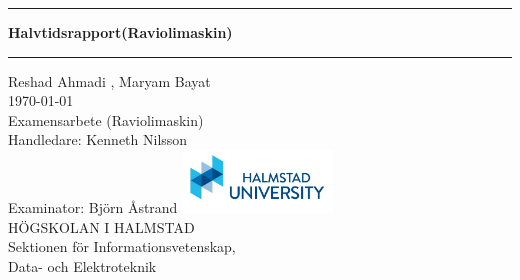 \documentclass[11pt,a4paper,oneside]{book}
\begin{document}
\pagestyle{empty}

\frontmatter

\begin{titlepage}
  \begin{center}
  \end{center}
  \vspace{3cm}
  \begin{center}
    \hrule \vspace{0.5cm}
    {\Huge \bfseries \sffamily \color{hhblue} Halvtidsrapport(Raviolimaskin)}\\
    \vspace{0.8cm} \hrule \vspace{2cm} {\Large{Reshad Ahmadi , Maryam Bayat}}\\
    \vspace{2cm}
    \today\\
    \vspace{3cm}
    Examensarbete (Raviolimaskin)\\
    \vspace{1.5cm}
    Handledare: Kenneth Nilsson\\
    \vspace{0.5cm} Examinator: Björn Åstrand \vfill
    \includegraphics[width=4cm]{images/hh_logo.jpg}\\
    HÖGSKOLAN I HALMSTAD\\
    Sektionen för Informationsvetenskap, \\
    Data- och Elektroteknik
  \end{center}
\end{titlepage}
\end{document}

